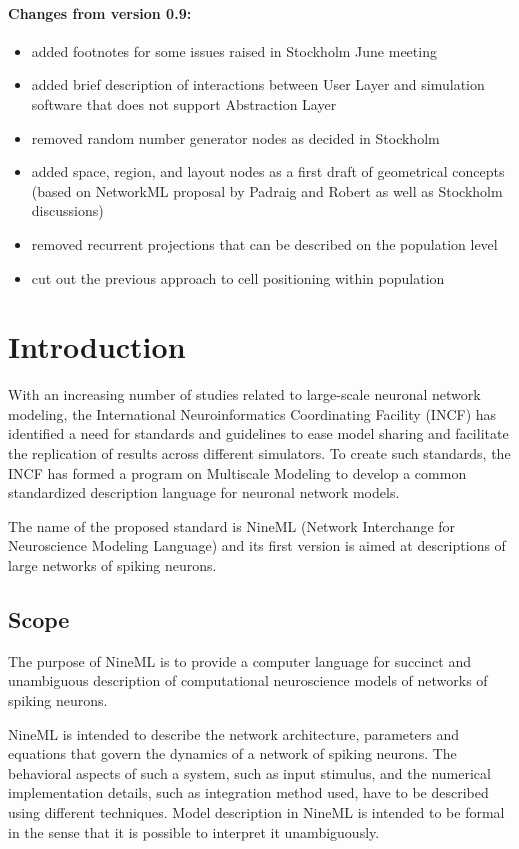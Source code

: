 \documentclass{article}
\begin{document}
\paragraph{Changes from version 0.9:}
\begin{itemize}
\item added footnotes for some issues raised in Stockholm June meeting
\item added brief description of interactions between User Layer and
simulation software that does not support Abstraction Layer
\item removed random number generator nodes as decided in Stockholm
\item added space, region, and layout nodes as a first draft of geometrical
concepts (based on NetworkML proposal by Padraig and Robert as well as
Stockholm discussions)
\item removed recurrent projections that can be described on the population
level
\item cut out the previous approach to cell positioning within population
\end{itemize}
\newpage

\section{Introduction}

With an increasing number of studies related to large-scale neuronal
network modeling, the International Neuroinformatics Coordinating
Facility (INCF) has identified a need for standards and guidelines to
ease model sharing and facilitate the replication of results across
different simulators. To create such standards, the INCF has formed a
program on Multiscale Modeling to develop a common standardized
description language for neuronal network models.

The name of the proposed standard is NineML (Network Interchange for
Neuroscience Modeling Language) and its first version is aimed at
descriptions of large networks of spiking neurons.

\subsection{Scope}

The purpose of NineML is to provide a computer language for
succinct and unambiguous description of computational neuroscience models of
networks of spiking neurons.

NineML is intended to describe the network architecture, parameters
and equations that govern the dynamics of a network of spiking
neurons. The behavioral aspects of such a system, such as input
stimulus, and the numerical implementation details, such as
integration method used, have to be described using different
techniques.  Model description in NineML is intended to be formal in
the sense that it is possible to interpret it unambiguously.
\end{document}
